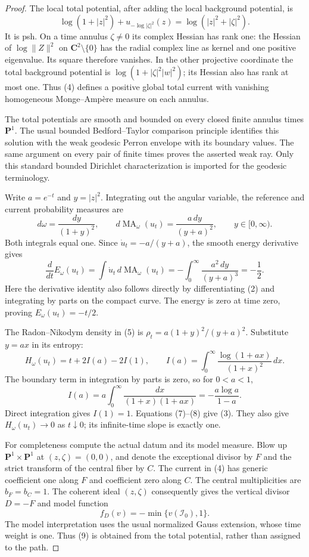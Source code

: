 \documentclass[11pt]{article}
\newcommand{\MA}{\operatorname{MA}}
\begin{document}
\begin{proof}
The local total potential, after adding the local background potential,
is
\[
 \log(1+|z|^2)+u_{-\log|\zeta|^2}(z)
       =\log(|z|^2+|\zeta|^2).
 \tag{4}
\]
It is psh. On a time annulus $\zeta\ne0$ its complex Hessian has
rank one: the Hessian of $\log\|Z\|^2$ on $\mathbf C^2\setminus
\{0\}$ has the radial complex line as kernel and one positive
eigenvalue. Its square therefore vanishes. In the other projective
coordinate the total background potential is
$\log(1+|\zeta|^2|w|^2)$; its Hessian also has rank at most one.
Thus (4) defines a positive global total current with vanishing
homogeneous Monge--Amp\`ere measure on each annulus.

The total potentials are smooth and bounded on every closed finite
annulus times $\mathbf P^1$. The usual bounded Bedford--Taylor
comparison principle identifies this solution with the weak
geodesic Perron envelope with its boundary values. The same argument
on every pair of finite times proves the asserted weak ray.
Only this standard bounded Dirichlet characterization is imported
for the geodesic terminology.

Write $a=e^{-t}$ and $y=|z|^2$. Integrating out the angular
variable, the reference and current probability measures are
\[
 d\omega=\frac{dy}{(1+y)^2},\qquad
 d\MA_\omega(u_t)=\frac{a\,dy}{(y+a)^2},\qquad y\in[0,\infty).
 \tag{5}
\]
Both integrals equal one. Since
$\dot u_t=-a/(y+a)$, the smooth energy derivative gives
\[
 \frac{d}{dt}E_\omega(u_t)
 =\int\dot u_t\,d\MA_\omega(u_t)
 =-\int_0^\infty\frac{a^2\,dy}{(y+a)^3}
 =-\frac12.
 \tag{6}
\]
Here the derivative identity also follows directly by differentiating
(2) and integrating by parts on the compact curve.
The energy is zero at time zero, proving $E_\omega(u_t)=-t/2$.

The Radon--Nikodym density in (5) is
$\rho_t=a(1+y)^2/(y+a)^2$. Substitute $y=ax$ in its entropy:
\[
 H_\omega(u_t)
 =t+2I(a)-2I(1),\qquad
 I(a)=\int_0^\infty\frac{\log(1+ax)}{(1+x)^2}\,dx.
 \tag{7}
\]
The boundary term in integration by parts is zero, so for
$0<a<1$,
\[
 I(a)=a\int_0^\infty\frac{dx}{(1+x)(1+ax)}
      =-\frac{a\log a}{1-a}.
 \tag{8}
\]
Direct integration gives $I(1)=1$. Equations (7)--(8) give (3).
They also give $H_\omega(u_t)\to0$ as $t\downarrow0$; its infinite-time
slope is exactly one.

For completeness compute the actual datum and its model measure.
Blow up $\mathbf P^1\times\mathbf P^1$ at $(z,\zeta)=(0,0)$,
and denote the exceptional divisor by $F$ and the strict transform
of the central fiber by $C$. The current in (4) has generic
coefficient one along $F$ and coefficient zero along $C$.
The central multiplicities are $b_F=b_C=1$.
The coherent ideal $(z,\zeta)$ consequently gives the vertical
divisor $D=-F$ and model function
\[
 f_D(v)=-\min\{v(\mathcal I_0),1\}.
 \tag{9}
\]
The model interpretation uses the usual normalized Gauss extension,
whose time weight is one. Thus (9) is obtained from the total
potential, rather than assigned to the path.


\end{proof}
\end{document}
